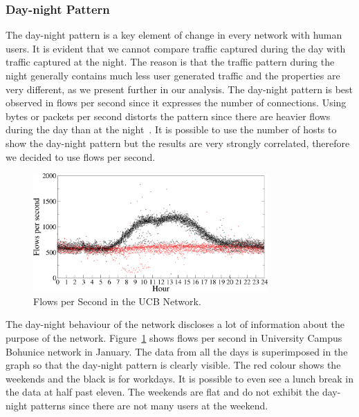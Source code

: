 \subsubsection{Day-night Pattern}

The day-night pattern is a key element of change in every network with human users. It is evident that we cannot compare traffic captured during the day with traffic captured at the night. The reason is that the traffic pattern during the night generally contains much less user generated traffic and the properties are very different, as we present further in our analysis. The day-night pattern is best observed in flows per second since it expresses the number of connections. Using bytes or packets per second distorts the pattern since there are heavier flows during the day than at the night~\cite{Quan-2010-Characteristics}. It is possible to use the number of hosts to show the day-night pattern but the results are very strongly correlated, therefore we decided to use flows per second.

\begin{figure}[!t]
        \begin{center}
                \includegraphics[width=0.8\textwidth]{figures/paper-characterization/flows-ukb-jan}
                \caption{Flows per Second in the UCB Network.}
                \label{fig:characterization-flows-ukb-jan}
        \end{center}
\end{figure}

The day-night behaviour of the network discloses a lot of information about the purpose of the network. Figure~\ref{fig:characterization-flows-ukb-jan} shows flows per second in University Campus Bohunice network in January. The data from all the days is superimposed in the graph so that the day-night pattern is clearly visible. The red colour shows the weekends and the black is for workdays. It is possible to even see a lunch break in the data at half past eleven. The weekends are flat and do not exhibit the day-night patterns since there are not many users at the weekend.

